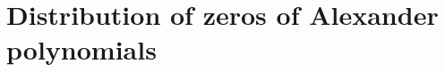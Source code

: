 \documentclass[table]{amsart}
\newtheorem{example}[theorem]{Example}
\newcommand{\cover}{\Sigma_2}
\numberwithin{equation}{section}
\begin{document}





\section{Distribution of zeros of Alexander polynomials}
\end{document}
